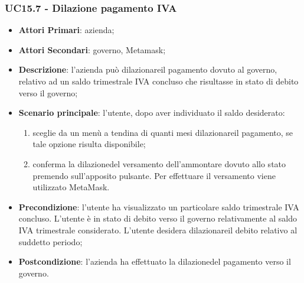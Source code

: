 \subsubsection{UC15.7 - Dilazione pagamento IVA}
\begin{itemize}
	\item \textbf{Attori Primari}: azienda;
	\item \textbf{Attori Secondari}: governo, Metamask\glo;
	\item \textbf{Descrizione}: l'azienda può dilazionare\glosp il pagamento dovuto al governo, relativo ad un saldo trimestrale IVA concluso che risultasse in stato di debito verso il governo;
	\item \textbf{Scenario principale}: l'utente, dopo aver individuato il saldo desiderato:
	\begin{enumerate}[label=\alph*.]
		\item sceglie da un menù a tendina di quanti mesi dilazionare\glosp il pagamento, se tale opzione risulta disponibile;
		\item conferma la dilazione\glosp del versamento dell'ammontare dovuto allo stato premendo sull'apposito pulsante. Per effettuare il versamento viene utilizzato MetaMask\glo.
	\end{enumerate}
	\item \textbf{Precondizione}: l'utente ha visualizzato un particolare saldo trimestrale IVA concluso. L'utente è in stato di debito verso il governo relativamente al saldo IVA trimestrale considerato. L'utente desidera dilazionare\glosp il debito relativo al suddetto periodo; 
	\item \textbf{Postcondizione}: l'azienda ha effettuato la dilazione\glosp del pagamento verso il governo.
\end{itemize} 





